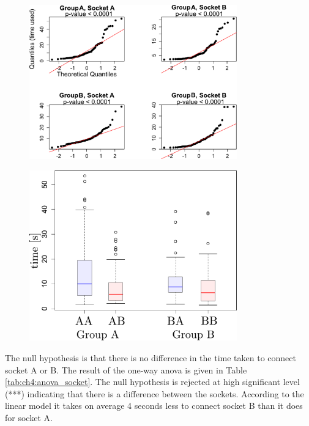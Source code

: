 \begin{appendices}
\begin{figure}
   \includegraphics[width=0.8\textwidth]{./ch4-PiH/Figures/QQplot.pdf}
   \caption{}
\end{figure}


\begin{figure}
  \includegraphics[width=0.8\textwidth]{./ch4-PiH/Figures/Group_Socket.pdf}
   \caption{}
\end{figure}

The null hypothesis is that there is no difference in the time taken to connect socket A or B. The result of the one-way anova
is given in Table \ref{tab:ch4:anova_socket}. The null hypothesis is rejected at high significant level (***) indicating that 
there is a difference between the sockets. According to the linear model it takes on average 4 seconds less to connect socket B 
than it does for socket A.
  

\end{appendices}
